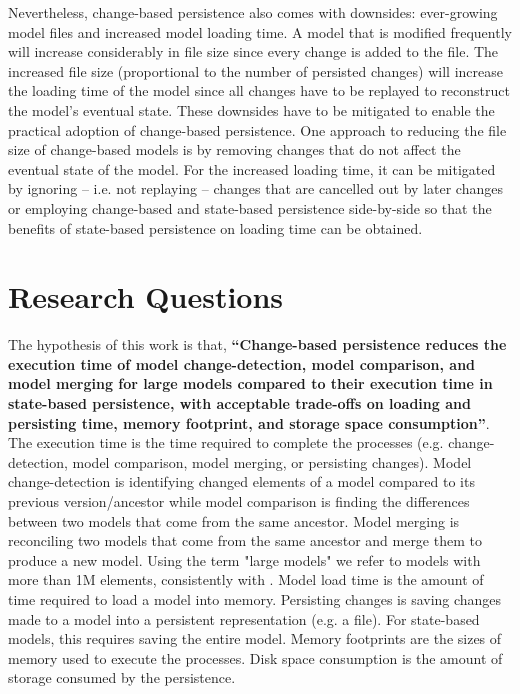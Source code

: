 \documentclass[12pt, a4paper]{report} \usepackage[titletoc]{appendix}
\begin{document}
Nevertheless, change-based persistence also comes with downsides:  ever-growing model files and increased model loading time. A model that is modified frequently will increase considerably in file size since every change is added to the file. The increased file size (proportional to the number of persisted changes) will increase the loading time of the model since all changes have to be replayed to reconstruct the model's eventual state. These downsides have to be mitigated to enable the practical adoption of change-based persistence. One approach to reducing the file size of change-based models is by removing changes that do not affect the eventual state of the model. For the increased loading time, it can be mitigated by ignoring -- i.e. not replaying -- changes that are cancelled out by later changes or employing change-based and state-based persistence side-by-side so that the benefits of state-based persistence on loading time can be obtained.   

\section{Research Questions}
\label{sec:research_questions}
The hypothesis of this work is that, \textbf{``Change-based persistence reduces the execution time of model change-detection, model comparison, and model merging for large models compared to their execution time in state-based persistence, with acceptable trade-offs on loading and persisting time, memory footprint, and storage space consumption''}. The execution time is the time required to complete the processes (e.g. change-detection, model comparison, model merging, or persisting changes). Model change-detection is identifying changed elements of a model compared to its previous version/ancestor while model comparison is finding the differences between two models that come from the same ancestor. Model merging is reconciling two models that come from the same ancestor and merge them to produce a new model. Using the term "large models" we refer to models with more than 1M elements, consistently with \cite{daniel2016neoemf,pagan2011morsa}. Model load time is the amount of time required to load a model into memory. Persisting changes is saving changes made to a model into a persistent representation (e.g. a file). For state-based models, this requires saving the entire model. Memory footprints are the sizes of memory used to execute the processes. Disk space consumption is the amount of storage consumed by the persistence.  
\end{document}
